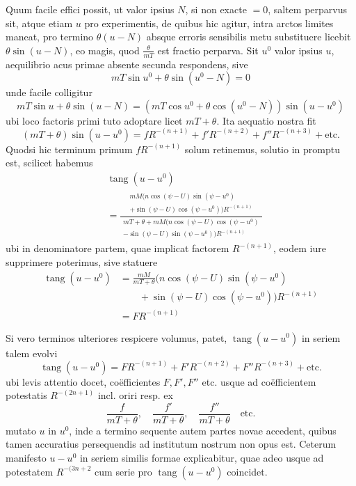 Quum facile effici possit, ut valor ipsius $N$, si non exacte $=0$, saltem perparvus sit, atque etiam $u$ pro experimentis, de quibus hic agitur, intra arctos limites maneat, pro termino $\theta(u-N)$ absque erroris sensibilis metu substituere licebit $\theta\sin(u-N)$, eo magis, quod $\frac{\theta}{mT}$ est fractio perparva. Sit $u^0$ valor ipsius $u$, aequilibrio acus primae absente secunda respondens, sive
\[
mT\sin u^0+\theta\sin(u^0-N)=0
\]
unde facile colligitur
\[
mT\sin u+\theta\sin(u-N)=(mT\cos u^0+\theta\cos(u^0-N))\sin(u-u^0)
\]
ubi loco factoris primi tuto adoptare licet $mT+\theta$. Ita aequatio nostra fit
\[
(mT+\theta)\sin(u-u^0)=fR^{-(n+1)}+f'R^{-(n+2)}+f''R^{-(n+3)}+\text{etc.}
\]
Quodsi hic terminum primum $fR^{-(n+1)}$ solum retinemus, solutio in promptu est, scilicet habemus
\[
\begin{aligned}
&\operatorname{tang}(u-u^0)\\
&=\frac{\begin{gathered}mM(n\cos(\psi-U)\sin(\psi-u^0)\\+\sin(\psi-U)\cos(\psi-u^0))R^{-(n+1)}\end{gathered}}{\begin{gathered}mT+\theta+mM(n\cos(\psi-U)\cos(\psi-u^0)\\-\sin(\psi-U)\sin(\psi-u^0))R^{-(n+1)}\end{gathered}}
\end{aligned}
\]
ubi in denominatore partem, quae implicat factorem $R^{-(n+1)}$, eodem iure supprimere poterimus, sive statuere
\[
\begin{aligned}
\operatorname{tang}(u-u^0)&=\frac{mM}{mT+\theta}(n\cos(\psi-U)\sin(\psi-u^0)\\
&\qquad+\sin(\psi-U)\cos(\psi-u^0))R^{-(n+1)}\\
&=FR^{-(n+1)}
\end{aligned}
\]

Si vero terminos ulteriores respicere volumus, patet, $\operatorname{tang}(u-u^0)$ in seriem talem evolvi
\[
\operatorname{tang}(u-u^0)=FR^{-(n+1)}+F'R^{-(n+2)}+F''R^{-(n+3)}+\text{etc.}
\]
ubi levis attentio docet, coëfficientes $F,F',F''$ etc. usque ad coëfficientem potestatis $R^{-(2n+1)}$ incl. oriri resp. ex
\[
\frac{f}{mT+\theta},\quad\frac{f'}{mT+\theta},\quad\frac{f''}{mT+\theta}\quad\text{etc.}
\]
mutato $u$ in $u^0$, inde a termino sequente autem partes novae accedent, quibus tamen accuratius persequendis ad institutum nostrum non opus est. Ceterum manifesto $u-u^0$ in seriem similis formae explicabitur, quae adeo usque ad potestatem $R^{-(3n+2}$ cum serie pro $\operatorname{tang}(u-u^0)$ coincidet.

